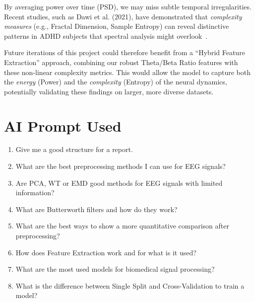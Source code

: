 \documentclass[11pt,a4paper]{article}
\begin{document}
By averaging power over time (PSD), we may miss subtle temporal irregularities. Recent studies, such as Dawi et al. (2021), have demonstrated 
that \textit{complexity measures} (e.g., Fractal Dimension, Sample Entropy) can reveal distinctive patterns in ADHD subjects that spectral 
analysis might overlook~\cite{dawi2021complexity}.

Future iterations of this project could therefore benefit from a ``Hybrid Feature Extraction'' approach, combining our robust Theta/Beta Ratio 
features with these non-linear complexity metrics. This would allow the model to capture both the \textit{energy} (Power) and the 
\textit{complexity} (Entropy) of the neural dynamics, potentially validating these findings on larger, more diverse datasets.

\newpage

\cleardoublepage
{}



\newpage

\section*{AI Prompt Used}
\begin{enumerate}
    \item Give me a good structure for a report.
    \item What are the best preprocessing methods I can use for EEG signals?
    \item Are PCA, WT or EMD good methods for EEG signals with limited information?
    \item What are Butterworth filters and how do they work?
    \item What are the best ways to show a more quantitative comparison after preprocessing?
    \item How does Feature Extraction work and for what is it used?
    \item What are the most used models for biomedical signal processing?
    \item What is the difference between Single Split and Cross-Validation to train a model?
\end{enumerate}
\end{document}
